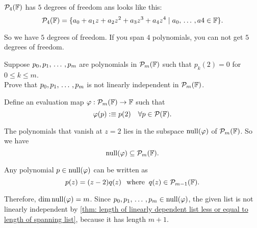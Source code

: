 \setcounter{xrcscount}{15}
\begin{xrcs}
  $\mathcal{P}_4(\mathbb{F})$ has $5$ degrees of freedom ans looks like this:
  \[
    \mathcal{P}_4(\mathbb{F}) = \{a_0 + a_1 z + a_2z^2 + a_3 z^3 + a_4 z^4 \mid a_0, {\, \ldots \,\,}, a4 \in \mathbb{F} \}.
  \]

  So we have $5$ degrees of freedom. If you span $4$ polynomials, you can not get $5$ degrees of freedom.
\end{xrcs}

\setcounter{xrcscount}{19}
\begin{xrcs}
  Suppose $p_0, p_1, {\, \ldots \,\,}, p_m$ are polynomials in $\mathcal{P}_m(\mathbb{F})$ such that $p_k(2) = 0$ for $0\leq k \leq m$. \\
  Prove that $p_0, p_1, {\, \ldots \,\,}, p_m$ is not linearly independent in $\mathcal{P}_m(\mathbb{F})$.

  \begin{prf}
    Define an evaluation map $\varphi : \mathcal{P}_m(\mathbb{F}) \to \mathbb{F}$ such that
    \[
    \varphi(p) :\equiv p(2) \quad \forall p \in \mathcal{P}(\mathbb{F}).
    \]

    The polynomials that vanish at $z=2$ lies in the subspace $\operatorname{null}(\varphi)$ of $\mathcal{P}_m(\mathbb{F})$. So  we have
    \[
    \operatorname{null}(\varphi) \subseteq \mathcal{P}_m(\mathbb{F}).
    \]

    Any polynomial $p \in \operatorname{null}(\varphi)$ can be written as
    \[
    p(z) = (z-2) q(z) \;\;\, \text{where}\;\; q(z) \in \mathcal{P}_{m-1} (\mathbb{F}).
    \]

    Therefore, $\operatorname{dim} \operatorname{null}(\varphi) = m$. Since $p_0, p_1, {\, \ldots \,\,}, p_m \in \operatorname{null}(\varphi)$, the given list is not linearly independent by \ref{thm: length of linearly dependent list less or equal to length of spanning list}, because it has length $m+1$.
  \end{prf}

\end{xrcs}

